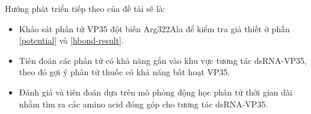 \documentclass[12pt,a4paper,reqno, oneside]{book}
\begin{document}
	Hướng phát triển tiếp theo của đề tài sẽ là:
	\begin{itemize}
	\item Khảo sát phân tử VP35 đột biến Arg322Ala để kiểm tra giả thiết ở phần \ref{potential} và \ref{hbond-result}.
	\item Tiên đoán các phân tử có khả năng gắn vào khu vực tương tác dsRNA-VP35, theo đó gợi ý phân tử thuốc có khả năng bất hoạt VP35.
	\item Đánh giá và tiên đoán dựa trên mô phỏng động học phân tử thời gian dài nhằm tìm ra các amino acid đóng góp cho tương tác dsRNA-VP35.
	\end{itemize}
	


\printbibliography
{}
\clearpage





\appendix
{}
\clearpage
\newpage

\newpage


\end{document}
